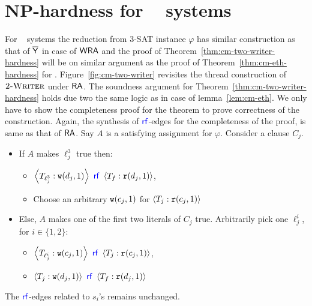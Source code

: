\section{NP-hardness for \twowriter~ systems}

For \twowriter~ systems the reduction from 3-SAT instance $\varphi$ has similar construction as that of $\overline{\mathsf{\color{black}Y}}$ in case of $\mathsf{WRA}$ and the proof of Theorem~\ref{thm:cm-two-writer-hardness} will be on similar argument as the proof of Theorem~\ref{thm:cm-eth-hardness} for \threewriter. Figure~\ref{fig:cm-two-writer} revisites the thread construction of $\textsc{2-Writer}$ under $\mathsf{RA}$. The soundness argument for Theorem~\ref{thm:cm-two-writer-hardness} holds due two the same logic as in case of lemma~\ref{lem:cm-eth}. We only have to show the completeness proof for the theorem to prove correctness of the construction.
Again, the synthesis of $\rf$-edges for the completeness of the proof, is same as that of  $\mathsf{RA}$. Say $A$ is a satisfying assignment for $\varphi$.  Consider a clause $C_j$.
\begin{itemize}
\item If $A$ makes $\ell_j^3$ true then:
\begin{itemize}
\item $\tuple{T_{\ell_j^3}: \wt(d_j, 1)}~\rf~\tuple{T_f: \rd(d_j, 1)}$,
\item Choose an arbitrary $\mathtt{w}(c_j, 1)$ for $\left\langle T_j: \mathtt{r}(c_j, 1)\right\rangle$
\end{itemize}
\item Else, $A$ makes one of the first two literals of $C_j$ true. Arbitrarily pick one $\ell_j^i$, for $i \in \{1,2\}$:  
\begin{itemize}
\item $\tuple{T_{\ell_j^i}: \wt(c_j, 1)}~\rf~ \tuple{T_j: \rd(c_j, 1)}$,
\item $\tuple{T_{j}:\wt(d_j, 1)}~\rf~\tuple{T_f: \rd(d_j, 1)}$
\end{itemize}
\end{itemize}
The $\rf$-edges related to $s_i$'s remains unchanged.

